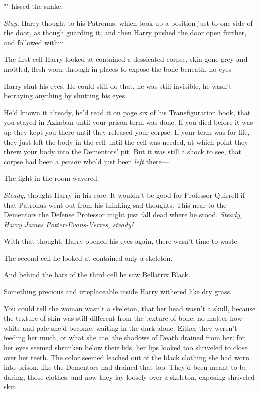 "" hissed the snake.

\emph{Stay,} Harry thought to his Patronus, which took up a position just to 
one side of the door, as though guarding it; and then Harry pushed the door 
open further, and followed within.

The first cell Harry looked at contained a dessicated corpse, skin gone grey 
and mottled, flesh worn through in places to expose the bone beneath, no eyes---

Harry shut his eyes. He could still do that, he was still invisible, he wasn't 
betraying anything by shutting his eyes.

He'd known it already, he'd read it on page six of his Transfiguration book, 
that you stayed in Azkaban until your prison term was done. If you died before 
it was up they kept you there until they released your corpse. If your term was 
for life, they just left the body in the cell until the cell was needed, at 
which point they threw your body into the Dementors' pit. But it was still a 
shock to see, that corpse had been a \emph{person} who'd just been \emph{left} 
there---

The light in the room wavered.

\emph{Steady,} thought Harry in his core. It wouldn't be good for Professor 
Quirrell if that Patronus went out from his thinking sad thoughts. This near to 
the Dementors the Defense Professor might just fall dead where he stood. 
\emph{Steady, Harry James Potter-Evans-Verres, steady!}

With that thought, Harry opened his eyes again, there wasn't time to waste.

The second cell he looked at contained only a skeleton.

And behind the bars of the third cell he saw Bellatrix Black.

Something precious and irreplaceable inside Harry withered like dry grass.

You could tell the woman wasn't a skeleton, that her head wasn't a skull, 
because the texture of skin was still different from the texture of bone, no 
matter how white and pale she'd become, waiting in the dark alone. Either they 
weren't feeding her much, or what she ate, the shadows of Death drained from 
her; for her eyes seemed shrunken below their lids, her lips looked too 
shriveled to close over her teeth. The color seemed leached out of the black 
clothing she had worn into prison, like the Dementors had drained that too. 
They'd been meant to be daring, those clothes, and now they lay loosely over a 
skeleton, exposing shriveled skin.

